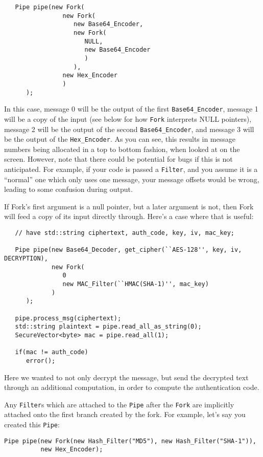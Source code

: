 \documentclass{article}
\newcommand{\type}[1]{\texttt{#1}}
\begin{document}
\begin{verbatim}
   Pipe pipe(new Fork(
                new Fork(
                   new Base64_Encoder,
                   new Fork(
                      NULL,
                      new Base64_Encoder
                      )
                   ),
                new Hex_Encoder
                )
      );
\end{verbatim}

In this case, message 0 will be the output of the first \type{Base64\_Encoder},
message 1 will be a copy of the input (see below for how \type{Fork} interprets
NULL pointers), message 2 will be the output of the second
\type{Base64\_Encoder}, and message 3 will be the output of the
\type{Hex\_Encoder}. As you can see, this results in message numbers being
allocated in a top to bottom fashion, when looked at on the screen. However,
note that there could be potential for bugs if this is not anticipated. For
example, if your code is passed a \type{Filter}, and you assume it is a
``normal'' one which only uses one message, your message offsets would be
wrong, leading to some confusion during output.

If Fork's first argument is a null pointer, but a later argument is
not, then Fork will feed a copy of its input directly through. Here's
a case where that is useful:

\begin{verbatim}
   // have std::string ciphertext, auth_code, key, iv, mac_key;

   Pipe pipe(new Base64_Decoder, get_cipher(``AES-128'', key, iv, DECRYPTION),
             new Fork(
                0
                new MAC_Filter(``HMAC(SHA-1)'', mac_key)
             )
      );

   pipe.process_msg(ciphertext);
   std::string plaintext = pipe.read_all_as_string(0);
   SecureVector<byte> mac = pipe.read_all(1);

   if(mac != auth_code)
      error();
\end{verbatim}

Here we wanted to not only decrypt the message, but send the decrypted
text through an additional computation, in order to compute the
authentication code.

Any \type{Filter}s which are attached to the \type{Pipe} after the
\type{Fork} are implicitly attached onto the first branch created by
the fork. For example, let's say you created this \type{Pipe}:

\begin{verbatim}
Pipe pipe(new Fork(new Hash_Filter("MD5"), new Hash_Filter("SHA-1")),
          new Hex_Encoder);
\end{verbatim}
\end{document}
